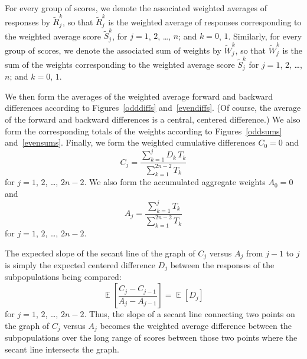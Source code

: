 \documentclass[]{fairmeta}
\DeclareMathOperator{\E}{\mathop{}\mathbb{E}}
\begin{document}
For every group of scores, we denote the associated weighted averages
of responses by $\tilde{R}_j^k$, so that $\tilde{R}_j^k$ is
the weighted average of responses corresponding
to the weighted average score $\tilde{S}_j^k$,
for $j = 1$, $2$, \dots, $n$; and $k = 0$, $1$.
Similarly, for every group of scores, we denote the associated sum
of weights by $\tilde{W}_j^k$, so that $\tilde{W}_j^k$ is
the sum of the weights corresponding
to the weighted average score $\tilde{S}_j^k$
for $j = 1$, $2$, \dots, $n$; and $k = 0$, $1$.

We then form the averages of the weighted average forward and backward
differences according to Figures~\ref{odddiffs} and~\ref{evendiffs}.
(Of course, the average of the forward and backward differences
is a central, centered difference.)
We also form the corresponding totals of the weights according
to Figures~\ref{oddsums} and~\ref{evensums}.
Finally, we form the weighted cumulative differences $C_0 = 0$ and
%
\begin{equation}
C_j = \frac{\sum_{k=1}^j D_k \, T_k}{\sum_{k=1}^{2n-2} T_k}
\end{equation}
%
for $j = 1$, $2$, \dots, $2n-2$.
We also form the accumulated aggregate weights $A_0 = 0$ and
%
\begin{equation}
A_j = \frac{\sum_{k=1}^j T_k}{\sum_{k=1}^{2n-2} T_k}
\end{equation}
%
for $j = 1$, $2$, \dots, $2n-2$.

The expected slope of the secant line of the graph of $C_j$ versus $A_j$
from $j-1$ to $j$ is simply the expected centered difference $D_j$
between the responses of the subpopulations being compared:
%
\begin{equation}
\E\left[ \frac{C_j - C_{j-1}}{A_j - A_{j-1}} \right] = \E[ D_j ]
\end{equation}
%
for $j = 1$, $2$, \dots, $2n-2$.
Thus, the slope of a secant line connecting two points on the graph
of $C_j$ versus $A_j$ becomes the weighted average difference
between the subpopulations over the long range of scores
between those two points where the secant line intersects the graph.
\end{document}
